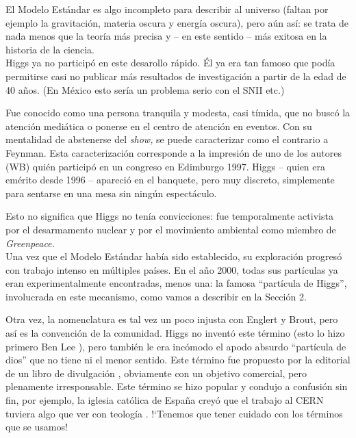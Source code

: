 El Modelo Est\'andar es algo incompleto para describir al
universo (faltan por ejemplo la gravitaci\'on, materia oscura y
energ\'ia oscura), pero a\'un as\'i: se trata de nada menos que la
teor\'ia m\'as precisa y -- en este sentido -- m\'as exitosa en
la historia de la ciencia.\\
 
Higgs ya no particip\'o en este desarollo r\'apido. \'El ya era
tan famoso que pod\'ia permitirse casi no publicar m\'as resultados
de investigaci\'on a partir de la edad de 40 a\~{n}os.
(En M\'exico esto ser\'ia un problema serio con el SNII etc.)
 
Fue conocido como una persona tranquila y modesta, casi t\'imida,
que no busc\'o la atenci\'on medi\'atica o ponerse en el centro de
atenci\'on en eventos. Con su mentalidad de abstenerse del
{\it show,} se puede caracterizar como el contrario a Feynman.
Esta caracterizaci\'on corresponde a la impresi\'on de uno de los
autores (WB) qui\'en particip\'o en un congreso en Edimburgo 1997.
Higgs -- quien era em\'erito desde 1996 -- apareci\'o en el banquete,
pero muy discreto, simplemente para sentarse en una mesa sin
ning\'un espect\'aculo.

Esto no significa que Higgs no ten\'ia convicciones: fue
temporalmente activista por el desarmamento nuclear y
por el movimiento ambiental como miembro de {\it Greenpeace.}\\

Una vez que el Modelo Est\'andar hab\'ia sido establecido, su exploraci\'on
progres\'o con trabajo intenso en m\'ultiples pa\'ises.
En el a\~no 2000, todas sus part\'iculas ya eran experimentalmente
encontradas, menos una: la famosa ``part\'icula de Higgs'', involucrada
en este mecanismo, como vamos a describir en la Secci\'on 2.

Otra vez, la nomenclatura es tal vez un poco injusta con Englert y
Brout, pero as\'i es la convenci\'on de la comunidad.
Higgs no invent\'o este t\'ermino (esto lo hizo primero  Ben Lee
\cite{boson}), pero tambi\'en le era inc\'omodo el
apodo absurdo ``part\'icula de dios'' que no tiene ni el menor sentido.
Este t\'ermino fue propuesto por la editorial de un libro de divulgaci\'on
\cite{Lederman},
obviamente con un objetivo comercial, pero plenamente irresponsable.
Este t\'ermino se hizo popular y condujo a confusi\'on sin fin,
por ejemplo, la iglesia cat\'olica de Espa\~na crey\'o que el trabajo al
CERN tuviera algo que ver con teolog\'ia \cite{Guardian}. !`Tenemos que
tener cuidado con los t\'erminos que se usamos!

